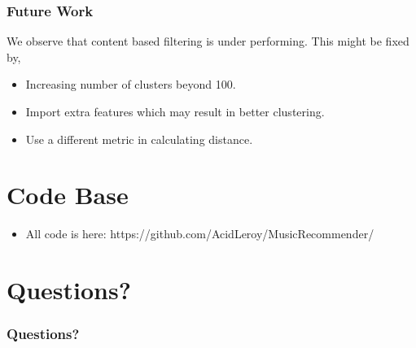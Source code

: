 \documentclass[11pt]{beamer}
\begin{document}
  \begin{frame}
    \frametitle{Future Work}
    We observe that content based filtering is under performing. This might be fixed by,
    \begin{itemize}
      \item Increasing number of clusters beyond 100.
      \item Import extra features which may result in better clustering.
      \item Use a different metric in calculating distance.
    \end{itemize}
  \end{frame}

  \section{Code Base}
  \begin{frame}
    \begin{itemize}
      \item All code is here: https://github.com/AcidLeroy/MusicRecommender/
    \end{itemize}
  \end{frame}

  \section{Questions?}
  \begin{frame}
    \frametitle{Questions?}

  \end{frame}


  
\end{document}
